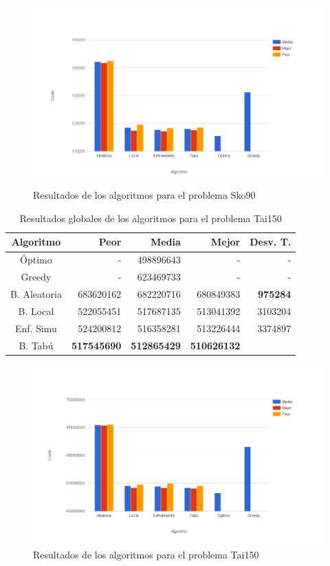 \documentclass[runningheads,a4paper]{llncs}
\begin{document}
\begin{figure}[H]
\center
\centerline{\includegraphics[scale=0.38]{./Grafico90.png}}
\caption{Resultados de los algoritmos para el problema Sko90}
\end{figure}

\begin{table}[H]
\centering
\caption{Resultados globales de los algoritmos para el problema Tai150}
\begin{tabular}{c || r | r | r | r}
Algoritmo 	& Peor & Media & Mejor & Desv. T. \\ \hline
Óptimo 		& - 	& 498896643	&	-	&	-		\\
Greedy 		& - 	& 623469733	&	-	&	-		\\ \hline
B. Aleatoria & 683620162 & 682220716 & 680849383 & \textbf{975284} \\
B. Local & 522055451 & 517687135 & 513041392 & 3103204 \\
Enf. Simu & 524200812 & 516358281 & 513226444 & 3374897 \\
B. Tabú & \quad \textbf{517545690} & \quad \textbf{512865429} & \quad \textbf{510626132} & \quad 2040887 \\
\end{tabular}
\end{table}

\begin{figure}[H]
\center
\centerline{\includegraphics[scale=0.38]{./Grafico150.png}}
\caption{Resultados de los algoritmos para el problema Tai150}
\end{figure}
\end{document}
